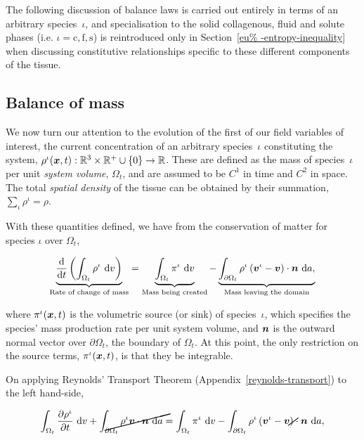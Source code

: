 The following discussion of balance laws is carried out entirely in
terms of an arbitrary species~$\iota$, and specialisation to the solid
collagenous, fluid and solute phases (i.e. \mbox{$\iota=\mathrm{c},
  \mathrm{f}, \mathrm{s}$}) is reintroduced only in Section~\ref{eu%
  -entropy-inequality} when discussing constitutive relationships
specific to these different components of the tissue.

\subsection{Balance of mass}
\label{eu-balance-of-mass}

We now turn our attention to the evolution of the first of our field
variables of interest, the current concentration of an arbitrary
species~$\iota$ constituting the system, $\rho^{\iota}(\mbox{\boldmath$ x$},t):
\mathbb{R}^3\times\mathbb{R}^{+}\cup\{0\} \rightarrow
\mathbb{R}$. These are defined as the mass of species~$\iota$ per unit
       {\em system volume}, $\Omega_{t}$, and are assumed to be
       $\mathit{C}^{1}$ in time and $\mathit{C}^{2}$ in space. The
       total {\em spatial density} of the tissue can be obtained by
       their summation, $\sum\limits_{\iota}\rho^\iota = \rho$.

With these quantities defined, we have from the conservation of matter
for species $\iota$ over $\Omega_{t}$,

\begin{equation}
\underbrace{\frac{\mathrm{d}} {\mathrm{d}t}\left(\int_{\Omega_{t}}
  \rho^{\iota} \ \mathrm{d}v \right)}_{\text{Rate of change of mass}}
= \underbrace{\int_{\Omega_{t}} \pi^{\iota} \ \mathrm{d}v}_{\text{Mass
    being created}} - \underbrace{\int_{\partial \Omega_{t}}
  \rho^{\iota} \left(\mbox{\boldmath$ v$}^{\iota} - \mbox{\boldmath$ v$}\right) \cdot
  \mbox{\boldmath$ n$}\ \mathrm{d}a,}_{\text{Mass leaving the domain}}
\label{eu-globalbalanceofmass}
\end{equation}

\noindent where $\pi^{\iota}(\mbox{\boldmath$ x$},t)$ is the volumetric source (or
sink) of species~$\iota$, which specifies the species' mass production
rate per unit system volume, and $\mbox{\boldmath$ n$}$ is the outward normal vector
over $\partial \Omega_{t}$, the boundary of $\Omega_{t}$. At this
point, the only restriction on the source terms, $\pi^{\iota}(\mbox{\boldmath$ x$},t)$,
is that they be integrable.

On applying Reynolds' Transport Theorem
(Appendix~\ref{reynolds-transport}) to the left hand-side,

\begin{equation*}
\int_{\Omega_{t}} \frac{\partial \rho^{\iota}}{\partial t}
\ \mathrm{d}v + \cancel{\int_{\partial \Omega_{t}} \rho^{\iota} \bv
  \cdot \bn\ \mathrm{d}a} = \int_{\Omega_{t}} \pi^{\iota}
\ \mathrm{d}v - \int_{\partial \Omega_{t}} \rho^{\iota}
\left(\bv^{\iota} - \cancel{\bv}\right) \cdot \bn\ \mathrm{d}a,
\end{equation*}

